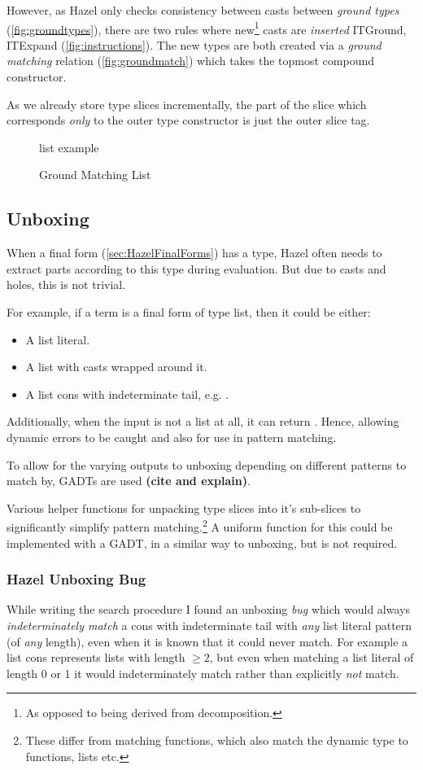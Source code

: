However, as Hazel only checks consistency between casts between \textit{ground types} (\cref{fig:groundtypes}), there are two rules where new\footnote{As opposed to being derived from decomposition.} casts are \textit{inserted} ITGround, ITExpand (\cref{fig:instructions}). The new types are both created via a \textit{ground matching} relation (\cref{fig:groundmatch}) which takes the topmost compound constructor. 

As we already store type slices incrementally, the part of the slice which corresponds \textit{only} to the outer type constructor is just the outer slice tag.

\begin{figure}
list example
\caption{Ground Matching List}
\end{figure}

\subsection{Unboxing}
When a final form (\cref{sec:HazelFinalForms}) has a type, Hazel often needs to extract parts according to this type during evaluation. But due to casts and holes, this is not trivial.

For example, if a term is a final form of type list, then it could be either:
\begin{itemize}
\item A list literal.
\item A list with casts wrapped around it.
\item A list cons with indeterminate tail, e.g. .
\end{itemize}
Additionally, when the input is not a list at all, it can return . Hence, allowing dynamic errors to be caught and also for use in pattern matching. 

To allow for the varying outputs to unboxing depending on different patterns to match by, GADTs are used \textbf{(cite and explain)}.

Various helper functions for unpacking type slices into it's sub-slices to significantly simplify pattern matching.\footnote{These differ from matching functions, which also match the dynamic type to functions, lists etc.} A uniform function for this could be implemented with a GADT, in a similar way to unboxing, but is not required.

\subsubsection{Hazel Unboxing Bug}
While writing the search procedure I found an unboxing \textit{bug} which would always \textit{indeterminately match} a cons with indeterminate tail with \textit{any} list literal pattern (of \textit{any} length), even when it is known that it could never match. For example a list cons  represents lists with length $\geq 2$, but even when matching a list literal of length 0 or 1 it would indeterminately match rather than explicitly \textit{not} match. 

